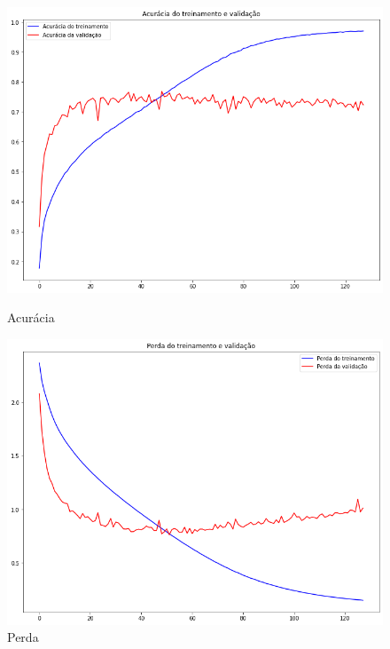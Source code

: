 \documentclass[12pt]{article}
\begin{document}
\begin{figure}[!htb]
  \begin{minipage}{.47\textwidth}
    \centering
    \includegraphics[width=1.1\linewidth]{experiments/lenet5_aug_128/accuracy.png}
    \caption{Acurácia}\label{fig:experiment_lenet5_aug_128_accuracy}
  \end{minipage}\hfill
  \begin{minipage}{.47\textwidth}
    \centering
    \includegraphics[width=1.1\linewidth]{experiments/lenet5_aug_128/loss.png}
    \caption{Perda}\label{fig:experiment_lenet5_aug_128_loss}
  \end{minipage}
\end{figure}
\end{document}
